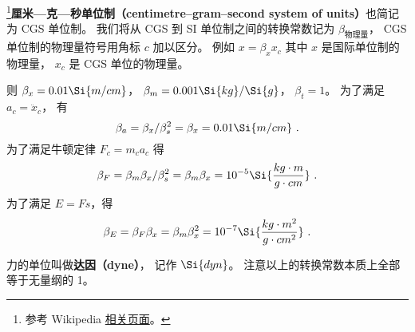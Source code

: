 
\begin{issues}
\issueDraft
{}
\end{issues}


\footnote{参考 Wikipedia \href{https://en.wikipedia.org/wiki/Centimetre-gram-second_system_of_units}{相关页面}。}\textbf{厘米—克—秒单位制（centimetre–gram–second system of units）}也简记为 CGS 单位制。 我们将从 CGS 到 SI 单位制之间的转换常数记为 $\beta_\text{物理量}$， CGS 单位制的物理量符号用角标 $c$ 加以区分。 例如 $x = \beta_x x_c$ 其中 $x$ 是国际单位制的物理量， $x_c$ 是 CGS 单位的物理量。

则 $\beta_x = 0.01\Si{m/cm}$， $\beta_m = 0.001\Si{kg}/\Si{g}$， $\beta_t = 1$。 为了满足 $a_c = \ddot x_c$， 有
\begin{equation}
\beta_a = \beta_x/\beta_s^2 = \beta_x = 0.01 \Si{m/cm}~.
\end{equation}
为了满足牛顿定律 $F_c = m_ca_c$ 得
\begin{equation}
\beta_F = \beta_m \beta_x/\beta_s^2 = \beta_m\beta_x = 10^{-5} \Si{\frac{kg\cdot m}{g\cdot cm}}~.
\end{equation}
为了满足 $E = Fs$，得
\begin{equation}
\beta_E = \beta_F \beta_x = \beta_m\beta_x^2 =  10^{-7} \Si{\frac{kg \cdot m^2}{g\cdot cm^2}}~.
\end{equation}


力的单位叫做\textbf{达因（dyne）}， 记作 $\Si{dyn}$。 注意以上的转换常数本质上全部等于无量纲的 1。
